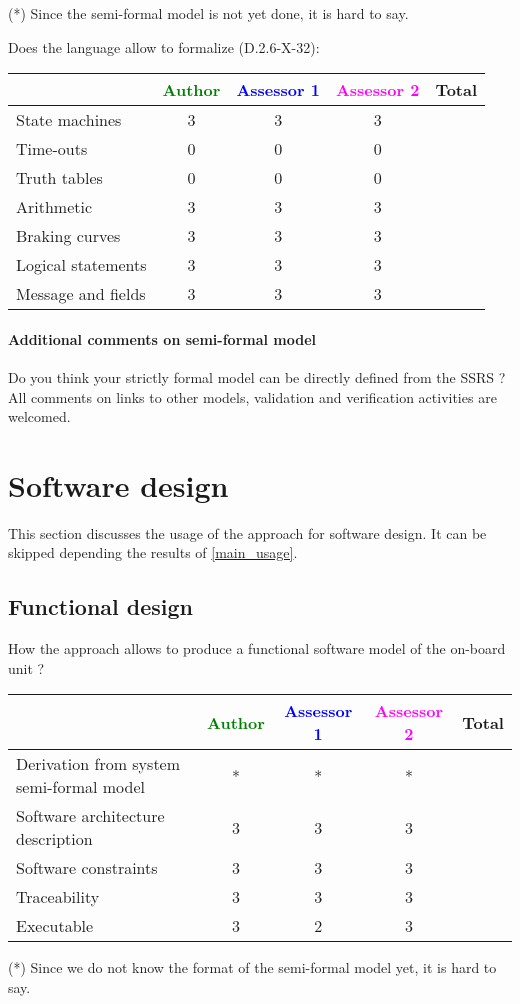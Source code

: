 \begin{author_comment}
(*) Since the semi-formal model is not yet done, it is hard to say.
\end{author_comment}
Does the language allow to  formalize (D.2.6-X-32):

\begin{tabular}{|l | c | c | c | c|}
\hline
& \textcolor{green}{Author} & \textcolor{blue}{Assessor 1} & \textcolor{magenta}{Assessor 2} & Total \\
\hline 
State machines  &3 &3 & 3 &  \\
\hline
Time-outs  &0 &0 & 0&  \\
\hline
Truth tables  &0 &0 & 0&  \\
\hline
Arithmetic  &3 &3 & 3&  \\
\hline
Braking curves  &3 &3 & 3&  \\
\hline
Logical statements &3 &3 & 3&  \\
\hline
Message and fields &3 &3 & 3&  \\
\hline
\end{tabular}

\paragraph{Additional comments on semi-formal  model} Do you think your strictly formal  model can be directly defined from the SSRS ?
All comments on links to  other models, validation and verification activities are welcomed.


\section{Software design}
This section discusses the usage of the approach for software design.
It can be skipped depending the results of \ref{main_usage}.

\subsection{Functional design}

How the approach allows to  produce a functional software model of the on-board unit ?

\begin{tabular}{|l | c | c | c | c|}
\hline
& \textcolor{green}{Author} & \textcolor{blue}{Assessor 1} & \textcolor{magenta}{Assessor 2} & Total \\
\hline
Derivation from system semi-formal model  &* &* & *&  \\
\hline 
Software architecture description  &3 &3 & 3&  \\
\hline
Software constraints  &3 &3 & 3&  \\
\hline
Traceability  &3 &3 & 3&  \\
\hline
Executable  &3 &2 & 3&  \\
\hline
\end{tabular}
\begin{author_comment}
(*) Since we do not know the format of the semi-formal model  yet, it is hard to say.
\end{author_comment}

